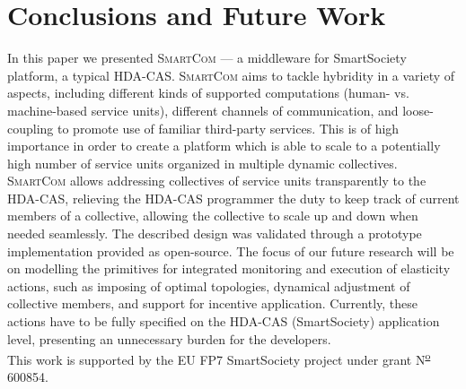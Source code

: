 \documentclass{llncs}
\newcommand{\mdl}{\textsc{SmartCom}}
\begin{document}
\section{Conclusions and Future Work}
\label{sec:conclusion}

  In this paper we presented \mdl{} --- a middleware for SmartSociety platform, a typical HDA-CAS. \mdl{} aims to tackle hybridity in a variety of aspects, including different kinds of supported computations (human- vs. machine-based service units), different channels of communication, and loose-coupling to promote use of familiar third-party services. This is of high importance in order to create a platform which is able to scale to a potentially high number of service units organized in multiple dynamic collectives. \mdl{} allows addressing collectives of service units transparently to the HDA-CAS, relieving the HDA-CAS programmer the duty to keep track of current members of a collective, allowing the collective to scale up and down when needed seamlessly. The described design was validated through a prototype implementation provided as open-source.
  The focus of our future research will be on modelling the primitives for integrated monitoring and execution of elasticity actions, such as imposing of optimal topologies, dynamical adjustment of collective members, and support for incentive application. Currently, these actions have to be fully specified on the HDA-CAS (SmartSociety) application level, presenting an unnecessary burden for the developers.
  \\







This work is supported by the EU FP7 SmartSociety project under grant N\textsuperscript{\underline{o}} 600854.


\end{document}

